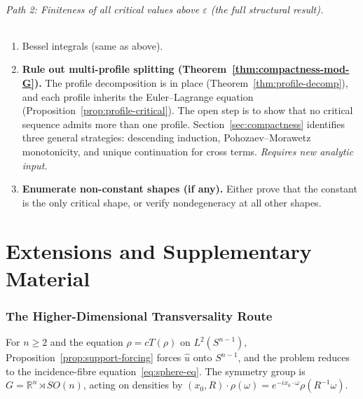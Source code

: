 \documentclass[12pt]{article}
\theoremstyle{definition}
\theoremstyle{remark}
\newcommand{\R}{\mathbb{R}}
\newcommand{\wh}{\widehat}
\begin{document}
\paragraph{Path 2: Finiteness of all critical values above
$\varepsilon$ (the full structural result).}
\begin{enumerate}[leftmargin=2em]
  \item Bessel integrals (same as above).

  \item \textbf{Rule out multi-profile splitting
    (Theorem~\ref{thm:compactness-mod-G}).}
    The profile decomposition is in place
    (Theorem~\ref{thm:profile-decomp}), and each profile inherits the
    Euler--Lagrange equation
    (Proposition~\ref{prop:profile-critical}).  The open step is to
    show that no critical sequence admits more than one profile.
    Section~\ref{sec:compactness} identifies three general strategies:
    descending induction, Pohozaev--Morawetz monotonicity, and unique
    continuation for cross terms.  \emph{Requires new analytic input.}

  \item \textbf{Enumerate non-constant shapes (if any).}  Either prove
    that the constant is the only critical shape, or verify
    nondegeneracy at all other shapes.
\end{enumerate}


\part{Extensions and Supplementary Material}

\section{The Higher-Dimensional Transversality Route}
\label{sec:higher-dim}

For $n\geq 2$ and the equation $\rho=cT(\rho)$ on $L^2(S^{n-1})$,
Proposition~\ref{prop:support-forcing} forces $\wh u$ onto $S^{n-1}$,
and the problem reduces to the incidence-fibre equation~\eqref{eq:sphere-eq}.
The symmetry group is $G=\R^n\rtimes SO(n)$, acting on densities by
$(x_0,R)\cdot\rho(\omega)=e^{-ix_0\cdot\omega}\rho(R^{-1}\omega)$.
\end{document}
